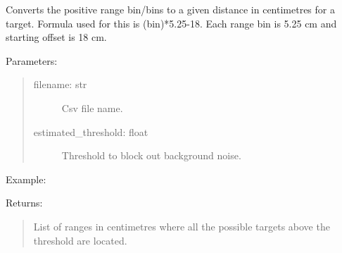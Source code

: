 \documentclass[letterpaper,10pt,english]{sphinxmanual}
\begin{document}

\begin{fulllineitems}
\label{\detokenize{X4 radar:X4_threshold.distance_finder}}
Converts the positive range bin/bins to a given distance in centimetres for a target.
Formula used for this is (bin)*5.25-18. Each range bin is 5.25 cm and starting offset is 18 cm.

Parameters:
\begin{quote}
\begin{description}
\item[{filename: str}] \leavevmode
Csv file name.

\item[{estimated\_threshold: float}] \leavevmode
Threshold to block out background noise.

\end{description}
\end{quote}

Example:

\begin{sphinxVerbatim}[commandchars=\\\{\}]
\PYG{p}{[}\PYG{p}{]}
\end{sphinxVerbatim}

Returns:
\begin{quote}

List of ranges in centimetres where all the possible targets above the threshold are located.
\end{quote}

\end{fulllineitems}

\end{document}
